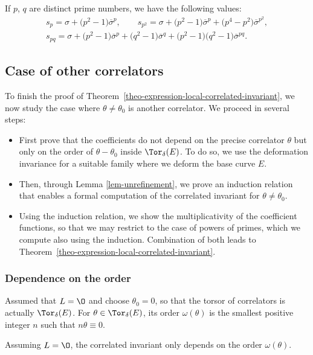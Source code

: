 \begin{expl}
If $p$, $q$ are distinct prime numbers, we have the following values:
 \begin{gather*}
s_p = \sigma+\bigl(p^2-1\bigr)\overline{\sigma}^p,\qquad
s_{p^2}= \sigma+\bigl(p^2-1\bigr)\overline{\sigma}^p+\bigl(p^4-p^2\bigr)\overline{\sigma}^{p^2},\\
s_{pq} = \sigma + \bigl(p^2-1\bigr)\overline{\sigma}^p + \bigl(q^2-1\bigr)\overline{\sigma}^q+\bigl(p^2-1\bigr)\bigl(q^2-1\bigr)\overline{\sigma}^{pq}.
\end{gather*}
\end{expl}


\subsection{Case of other correlators}

To finish the proof of Theorem~\ref{theo-expression-local-correlated-invariant}, we now study the case where $\theta\neq\theta_0$ is another correlator. We proceed in several steps:
 \begin{itemize}\itemsep=0pt %
 \item First prove that the coefficients do not depend on the precise correlator $\theta$ but only on the order of $\theta-\theta_0$ inside $\Tor_\delta(E)$. To do so, we use the deformation invariance for a suitable family where we deform the base curve $E$.
 \item Then, through Lemma \ref{lem-unrefinement}, we prove an induction relation that enables a formal computation of the correlated invariant for $\theta\neq \theta_0$.
 \item Using the induction relation, we show the multiplicativity of the coefficient functions, so that we may restrict to the case of powers of primes, which we compute also using the induction. Combination of both leads to Theorem~\ref{theo-expression-local-correlated-invariant}.
 \end{itemize}

\subsubsection{Dependence on the order} Assumed that $L=\O$ and choose $\theta_0=0$, so that the torsor of correlators is actually $\Tor_\delta(E)$. For $\theta\in\Tor_\delta(E)$, its order $\omega(\theta)$ is the smallest positive integer $n$ such that $n\theta\equiv 0$.

\begin{lem}
 Assuming $L=\O$, the correlated invariant  only depends on the order $\omega(\theta)$.
\end{lem}


